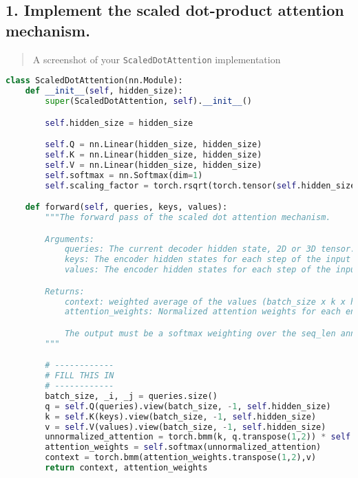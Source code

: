 \documentclass{article}
\begin{document}
\subsection*{1. Implement the scaled dot-product attention mechanism.}

\begin{quote}
A screenshot of your \texttt{ScaledDotAttention} implementation
\end{quote}

\begin{lstlisting}[language=Python]
class ScaledDotAttention(nn.Module):
    def __init__(self, hidden_size):
        super(ScaledDotAttention, self).__init__()

        self.hidden_size = hidden_size

        self.Q = nn.Linear(hidden_size, hidden_size)
        self.K = nn.Linear(hidden_size, hidden_size)
        self.V = nn.Linear(hidden_size, hidden_size)
        self.softmax = nn.Softmax(dim=1)
        self.scaling_factor = torch.rsqrt(torch.tensor(self.hidden_size, dtype= torch.float))

    def forward(self, queries, keys, values):
        """The forward pass of the scaled dot attention mechanism.

        Arguments:
            queries: The current decoder hidden state, 2D or 3D tensor. (batch_size x (k) x hidden_size)
            keys: The encoder hidden states for each step of the input sequence. (batch_size x seq_len x hidden_size)
            values: The encoder hidden states for each step of the input sequence. (batch_size x seq_len x hidden_size)

        Returns:
            context: weighted average of the values (batch_size x k x hidden_size)
            attention_weights: Normalized attention weights for each encoder hidden state. (batch_size x seq_len x 1)

            The output must be a softmax weighting over the seq_len annotations.
        """

        # ------------
        # FILL THIS IN
        # ------------
        batch_size, _i, _j = queries.size()
        q = self.Q(queries).view(batch_size, -1, self.hidden_size)
        k = self.K(keys).view(batch_size, -1, self.hidden_size)
        v = self.V(values).view(batch_size, -1, self.hidden_size)
        unnormalized_attention = torch.bmm(k, q.transpose(1,2)) * self.scaling_factor
        attention_weights = self.softmax(unnormalized_attention)
        context = torch.bmm(attention_weights.transpose(1,2),v)
        return context, attention_weights
\end{lstlisting}
\end{document}
